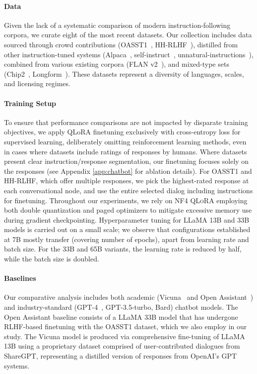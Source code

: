 \paragraph{Data}
Given the lack of a systematic comparison of modern instruction-following corpora, we curate eight of the most recent datasets. Our collection includes data sourced through crowd contributions (OASST1~\citep{kopf2023openassistant}, HH-RLHF~\citep{bai2022training}), distilled from other instruction-tuned systems (Alpaca~\citep{alpaca}, self-instruct~\citep{wang2022self}, unnatural-instructions~\citep{honovich2022unnatural}), combined from various existing corpora (FLAN v2~\citep{chung2022scaling}), and mixed-type sets (Chip2~\citep{laion2023}, Longform~\citep{koksal2023longform}). These datasets represent a diversity of languages, scales, and licensing regimes.

\paragraph{Training Setup}
To ensure that performance comparisons are not impacted by disparate training objectives, we apply QLoRA finetuning exclusively with cross-entropy loss for supervised learning, deliberately omitting reinforcement learning methods, even in cases where datasets include ratings of responses by humans. Where datasets present clear instruction/response segmentation, our finetuning focuses solely on the responses (see Appendix \ref{app:chatbot} for ablation details). For OASST1 and HH-RLHF, which offer multiple responses, we pick the highest-rated response at each conversational node, and use the entire selected dialog including instructions for finetuning. Throughout our experiments, we rely on NF4 \textsc{QLoRA} employing both double quantization and paged optimizers to mitigate excessive memory use during gradient checkpointing. Hyperparameter tuning for LLaMA 13B and 33B models is carried out on a small scale; we observe that configurations established at 7B mostly transfer (covering number of epochs), apart from learning rate and batch size. For the 33B and 65B variants, the learning rate is reduced by half, while the batch size is doubled.

\paragraph{Baselines}
Our comparative analysis includes both academic (Vicuna~\citep{vicuna2023} and Open Assistant~\citep{kopf2023openassistant}) and industry-standard (GPT-4~\citep{openai2023gpt}, GPT-3.5-turbo, Bard) chatbot models. The Open Assistant baseline consists of a LLaMA 33B model that has undergone RLHF-based finetuning with the OASST1 dataset, which we also employ in our study. The Vicuna model is produced via comprehensive fine-tuning of LLaMA 13B using a proprietary dataset comprised of user-contributed dialogues from ShareGPT, representing a distilled version of responses from OpenAI’s GPT systems.


